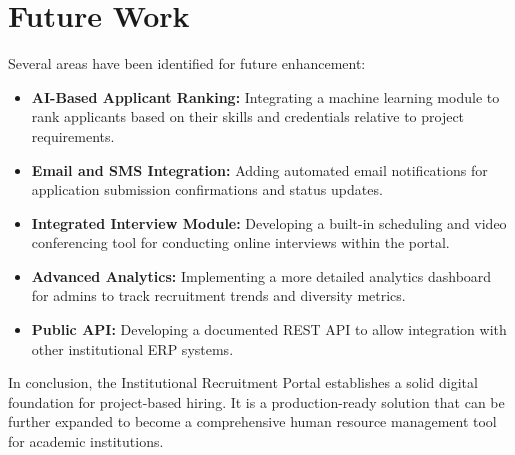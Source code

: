 \section{Future Work}

Several areas have been identified for future enhancement:

\begin{itemize}
  \item \textbf{AI-Based Applicant Ranking:} Integrating a machine learning module to rank applicants based on their skills and credentials relative to project requirements.
  
  \item \textbf{Email and SMS Integration:} Adding automated email notifications for application submission confirmations and status updates.
  
  \item \textbf{Integrated Interview Module:} Developing a built-in scheduling and video conferencing tool for conducting online interviews within the portal.
  
  \item \textbf{Advanced Analytics:} Implementing a more detailed analytics dashboard for admins to track recruitment trends and diversity metrics.
  
  \item \textbf{Public API:} Developing a documented REST API to allow integration with other institutional ERP systems.
\end{itemize}

In conclusion, the Institutional Recruitment Portal establishes a solid digital foundation for project-based hiring. It is a production-ready solution that can be further expanded to become a comprehensive human resource management tool for academic institutions.